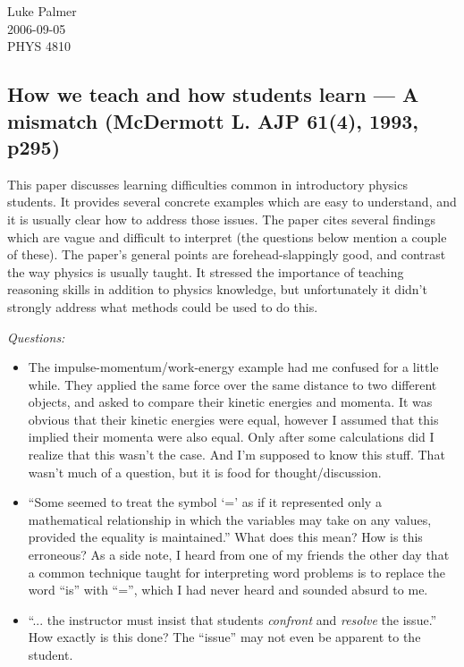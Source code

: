 \documentclass[12pt]{article}
\begin{document}
\noindent Luke Palmer \\
2006-09-05 \\
PHYS 4810

\subsection*{How we teach and how students learn --- A mismatch
             (McDermott L. AJP 61(4), 1993, p295)}


This paper discusses learning difficulties common in introductory
physics students.  It provides several concrete examples which are easy
to understand, and it is usually clear how to address those issues.  The
paper cites several findings which are vague and difficult to interpret
(the questions below mention a couple of these).  The paper's general
points are forehead-slappingly good, and contrast the way physics is
usually taught.  It stressed the importance of teaching reasoning skills
in addition to physics knowledge, but unfortunately it didn't strongly
address what methods could be used to do this.

\addvspace{1ex}
\noindent \textit{Questions:}

\begin{itemize}
\item The impulse-momentum/work-energy example had me confused for a
little while.  They applied the same force over the same distance to two
different objects, and asked to compare their kinetic energies and
momenta.  It was obvious that their kinetic energies were equal, however
I assumed that this implied their momenta were also equal.  Only after
some calculations did I realize that this wasn't the case.  And I'm
supposed to know this stuff.  That wasn't much of a question, but it is
food for thought/discussion.
\item ``Some seemed to treat the symbol `=' as if it represented only a
mathematical relationship in which the variables may take on any values,
provided the equality is maintained.''  What does this mean?  How is
this erroneous?   As a side note, I heard from one of my friends the
other day that a common technique taught for interpreting word problems
is to replace the word ``is'' with ``='', which I had never heard and
sounded absurd to me. 
\item ``... the instructor must insist that students \textit{confront}
and \textit{resolve} the issue.''  How exactly is this done?  The
``issue'' may not even be apparent to the student.
\end{itemize}
\end{document}
